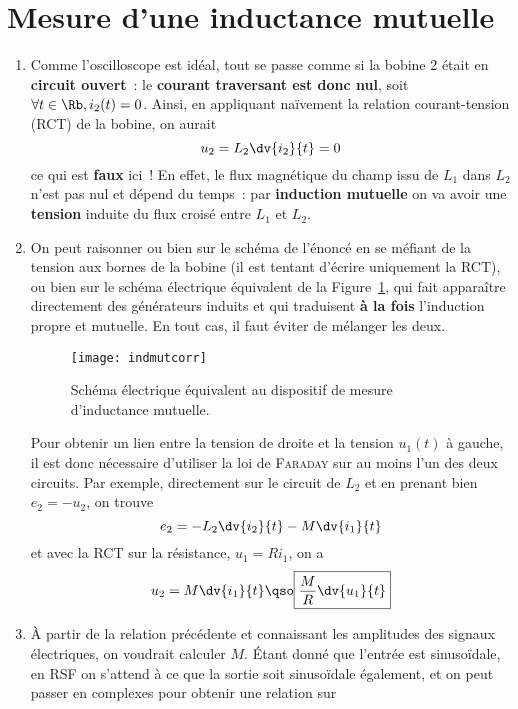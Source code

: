 \documentclass[a4paper, 10pt, final, garamond]{book}
\begin{document}
\section{Mesure d'une inductance mutuelle}
\label{sec:inducmutcorr}
\begin{enumerate}
	\item Comme l'oscilloscope est idéal, tout se passe comme si la bobine 2 était
	      en \textbf{circuit ouvert}~: le \textbf{courant traversant est donc
		      nul}, soit $\forall t \in \Rb, i_2(t) = 0$. Ainsi, en appliquant
	      naïvement la relation courant-tension (RCT) de la bobine, on aurait
	      \[
		      u_2 = L_2 \dv{i_2}{t} = 0
	      \]
	      ce qui est \textbf{faux} ici~! En effet, le flux magnétique du champ
	      issu de $L_1$ dans $L_2$ n'est pas nul et dépend du temps~: par
	      \textbf{induction mutuelle} on va avoir une \textbf{tension} induite du
	      flux croisé entre $L_1$ et $L_2$.
	\item On peut raisonner ou bien sur le schéma de l'énoncé en se méfiant de
	      la tension aux bornes de la bobine (il est tentant d'écrire uniquement
	      la RCT), ou bien sur le schéma électrique équivalent de la
	      Figure~\ref{fig:indmutcorr}, qui fait apparaître directement des
	      générateurs induits et qui traduisent \textbf{à la fois} l'induction
	      propre et mutuelle. En tout cas, il faut éviter de mélanger les deux.
	      \begin{figure}[htbp]
		      \centering
		      \texttt{[image: indmutcorr]}
		      \caption{Schéma électrique équivalent au dispositif de mesure
			      d'inductance mutuelle.}
		      \label{fig:indmutcorr}
	      \end{figure}
	      Pour obtenir un lien entre la tension de droite et la tension $u_1(t)$ à
	      gauche, il est donc nécessaire d'utiliser la loi de \textsc{Faraday} sur
	      au moins l'un des deux circuits. Par exemple, directement sur le circuit
	      de $L_2$ et en prenant bien $e_2 = -u_2$, on trouve
	      \[
		      e_2 = -L_2 \dv{i_2}{t} - M \dv{i_1}{t}
	      \]
	      et avec la RCT sur la résistance, $u_1 = R i_1$, on a
	      \[
		      u_2 = M \dv{i_1}{t}
		      \qso
		      \boxed{\frac{M}{R} \dv{u_1}{t}}
	      \]
	\item À partir de la relation précédente et connaissant les amplitudes des
	      signaux électriques, on voudrait calculer $M$. Étant donné que l'entrée
	      est sinusoïdale, en RSF on s'attend à ce que la sortie soit sinusoïdale
	      également, et on peut passer en complexes pour obtenir une relation sur

\end{enumerate}
\end{document}
